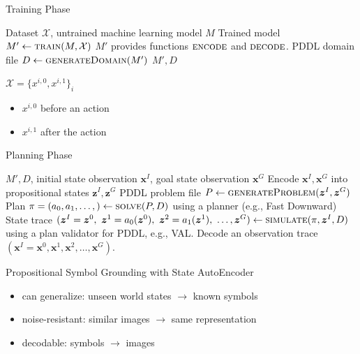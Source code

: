 \documentclass{lecture}
\def\vx{{\bm{x}}}
\def\vz{{\bm{z}}}
\newcommand{\function}[1]{\textsc{#1}}
\newcommand{\init}{{\vx^{I}}}
\newcommand{\goal}{{\vx^{G}}}
\newcommand{\zinit}{{\vz^{I}}}
\newcommand{\zgoal}{{\vz^{G}}}
\newcommand{\encode}{\function{encode}}
\newcommand{\decode}{\function{decode}}
\newcommand{\Xtr}{\mathcal{X}}
\begin{document}
\begin{frame}[fragile]{Training Phase}        
        \begin{algorithmic}[1]
         \REQUIRE Dataset $\Xtr$, untrained machine learning model $M$
         \STATE Trained model $M' \gets \function{train}(M,\Xtr)$ \label{line:train}
         \STATE $M'$ provides functions $\encode$ and $\decode$. \label{line:provide-encode-decode}
         \STATE PDDL domain file $D \gets \function{generateDomain}(M')$ \label{line:generate-domain}
         \RETURN $M', D$
        \end{algorithmic}
        \vfill
        $\Xtr=\{x^{i,0}, x^{i,1}\}_i$
        \begin{itemize}
            \item $x^{i,0}$ before an action
            \item $x^{i,1}$ after the action
        \end{itemize}
        \vfill
\end{frame}

\begin{frame}[fragile]{Planning Phase}        
       \begin{algorithmic}[1]
         \REQUIRE $M', D$, initial state observation $\init$, goal state observation $\goal$
         \STATE Encode $\init, \goal$ into propositional states $\zinit, \zgoal$ \label{line:encode-init-goal}
         \STATE PDDL problem file $P \gets \function{generateProblem}(\zinit, \zgoal)$ \label{line:generate-problem}
         \STATE Plan $\pi=(a_0, a_1, \ldots, ) \gets \function{solve}(P, D)$ using a planner (e.g., Fast Downward) \label{line:plan}
         \STATE State trace $(\zinit=\vz^0,\  \vz^1=a_0(\vz^0),\  \vz^2=a_1(\vz^1),\  \ldots, \zgoal) \gets \function{simulate}(\pi, \zinit, D)$
        using a plan validator for PDDL, e.g., VAL.  \label{line:simulate}
         \RETURN Decode an observation trace $(\init=\vx^0, \vx^1, \vx^2, \ldots, \goal)$. \label{line:decode-plan}
        \end{algorithmic}        
\end{frame}

\begin{frame}{Propositional Symbol Grounding with State AutoEncoder}
    \begin{itemize}
        \item can generalize: unseen world states $\to$ known symbols
        \item noise-resistant: similar images $\to$ same representation
        \item decodable: symbols $\to$ images
    \end{itemize}
\end{frame}
\end{document}
